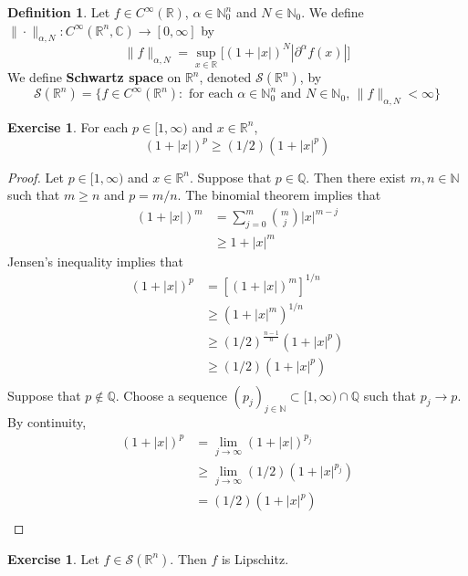 \documentclass{book}
\theoremstyle{definition}
\newtheorem{defn}[definition]{Definition}
\newtheorem{ex}[definition]{Exercise}
\newcommand{\al}{\alpha}
\newcommand{\C}{\mathbb{C}}
\newcommand{\N}{\mathbb{N}}
\newcommand{\Q}{\mathbb{Q}}
\newcommand{\R}{\mathbb{R}}
\newcommand{\MS}{\mathcal{S}}
\newcommand{\lex}[1]{\label{ex:#1}}
\newcommand{\ld}[1]{\label{defn:#1}}
\DeclareMathOperator*{\0}{\mbf{0}}
\DeclareMathOperator*{\1}{\mbf{1}}
\newcommand{\p}{\partial}
\newcommand{\RG}{[0,\infty]}
\begin{document}
	\begin{defn}
		\ld{101} Let $f \in C^{\infty}(\R)$, $\al \in \N_0^n$ and $N \in \N_0$. We define $\| \cdot \|_{\al, N}: C^{\infty}(\R^n, \C) \rightarrow \RG$ by 
		$$\|f\|_{\al, N} = \sup_{x \in \R} \bigg[  (1 + |x|)^N |\p^{\al}f (x)| \bigg] $$
		We define \textbf{Schwartz space} on $\R^n$, denoted $\MS(\R^n)$, by $$\MS(\R^n) = \{f \in C^{\infty}(\R^n): \text{ for each $\al \in \N_0^n$ and $N \in  \N_0$, } \|f\|_{\al, N} < \infty\}$$
	\end{defn}

	\begin{ex}
		For each $p \in [1, \infty)$ and $x \in \R^n$, 
		$$(1 + |x|)^p \geq (1/2) (1 + |x|^p)$$
	\end{ex}
	
	\begin{proof}
		Let $p \in [1, \infty)$ and $x \in \R^n$. Suppose that $p \in \Q$. Then there exist $m,n \in \N$ such that $m \geq n$ and $p = m/n$. The binomial theorem implies that 
		\begin{align*}
			(1 + |x|)^m
			& = \sum_{j=0}^{m} {m \choose j}|x|^{m-j} \\
			& \geq 1 + |x|^m
		\end{align*} 
		Jensen's inequality implies that 
		\begin{align*}
			(1 + |x|)^p
			& = [(1 + |x|)^m]^{1/n} \\
			& \geq (1 + |x|^m)^{1/n} \\
			& \geq (1/2)^{\frac{n-1}{n}} (1 + |x|^p) \\
			& \geq (1/2) (1 + |x|^p) \\
		\end{align*}
		Suppose that $p \not \in \Q$. Choose a sequence $(p_j)_{j \in \N} \subset [1, \infty) \cap \Q$ such that $p_j \rightarrow p$. By continuity, 
		\begin{align*}
			(1 + |x|)^p
			& = \lim_{j \rightarrow \infty} (1 + |x|)^{p_j} \\
			& \geq \lim_{j \rightarrow \infty} (1/2) (1 + |x|^{p_j}) \\
			& = (1/2) (1 + |x|^p) \\
		\end{align*}
	\end{proof}

	\begin{ex}
		\lex{102} Let $f \in \MS(\R^n)$. Then $f$ is Lipschitz.
	\end{ex}
	
\end{document}
